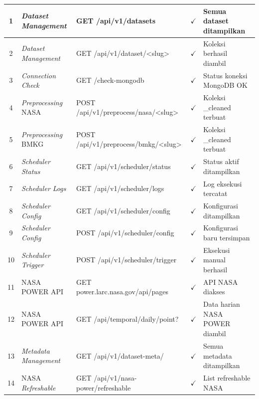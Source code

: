 \begin{longtable}{|c|p{2.5cm}|>{\raggedright\arraybackslash}p{5.5cm}|c|p{3.5cm}|}
            \scriptsize  %
            \setlength{\tabcolsep}{3pt}  %
                1 & \textit{Dataset Management} & GET /api/v1/datasets & $\checkmark$ & Semua dataset ditampilkan \\
                \hline
                2 & \textit{Dataset Management} & GET /api/v1/dataset/<slug> & $\checkmark$ & Koleksi berhasil diambil \\
                \hline
                3 & \textit{Connection Check} & GET /check-mongodb & $\checkmark$ & Status koneksi MongoDB OK \\
                \hline
                4 & \textit{Preprocessing} NASA & POST /api/v1/preprocess/nasa/<slug> & $\checkmark$ & Koleksi \_cleaned terbuat \\
                \hline
                5 & \textit{Preprocessing} BMKG & POST /api/v1/preprocess/bmkg/<slug> & $\checkmark$ & Koleksi \_cleaned terbuat \\
                \hline
                6 & \textit{Scheduler Status} & GET /api/v1/scheduler/status & $\checkmark$ & Status aktif ditampilkan \\
                \hline
                7 & \textit{Scheduler Logs} & GET /api/v1/scheduler/logs & $\checkmark$ & Log eksekusi tercatat \\
                \hline
                8 & \textit{Scheduler Config} & GET /api/v1/scheduler/config & $\checkmark$ & Konfigurasi ditampilkan \\
                \hline
                9 & \textit{Scheduler Config} & POST /api/v1/scheduler/config & $\checkmark$ & Konfigurasi baru tersimpan \\
                \hline
                10 & \textit{Scheduler Trigger} & POST /api/v1/scheduler/trigger & $\checkmark$ & Eksekusi manual berhasil \\
                \hline
                11 & NASA POWER API & GET power.larc.nasa.gov/api/pages & $\checkmark$ & API NASA diakses \\
                \hline
                12 & NASA POWER API & GET /api/temporal/daily/point? & $\checkmark$ & Data harian NASA POWER diambil \\
                \hline
                13 & \textit{Metadata Management} & GET /api/v1/dataset-meta/ & $\checkmark$ & Semua metadata ditampilkan \\
                \hline
                14 & NASA \textit{Refreshable} & GET /api/v1/nasa-power/refreshable & $\checkmark$ & List refreshable NASA \\

\end{longtable}
